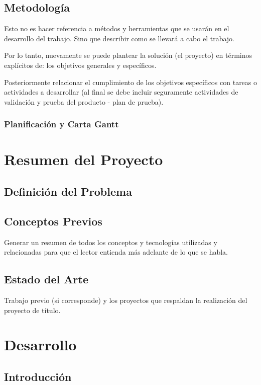 \documentclass[letter,12pt]{report}
\begin{document}
\section{Metodología}
Esto no es hacer referencia a métodos y herramientas que se usarán en el desarrollo del trabajo. Sino que describir como se llevará a cabo el trabajo.

Por lo tanto, nuevamente se puede plantear la solución (el proyecto) en términos explícitos de: los objetivos generales y específicos.

Posteriormente relacionar el cumplimiento de los objetivos específicos con tareas o actividades a desarrollar (al final se debe incluir seguramente actividades de validación y prueba del producto - plan de prueba).


\subsection{Planificación y Carta Gantt}
\blindtext %



\chapter{Resumen del Proyecto}
\section{Definición del Problema}
\blindtext %
 

\section{Conceptos Previos}
Generar un resumen de todos los conceptos y tecnologías utilizadas y relacionadas para que el lector entienda más adelante de lo que se habla.
\section{Estado del Arte}
Trabajo previo (si corresponde) y los proyectos que respaldan la realización del proyecto de título.




\chapter{Desarrollo}
\blindtext %

\section{Introducción}
\blindtext %
\end{document}

